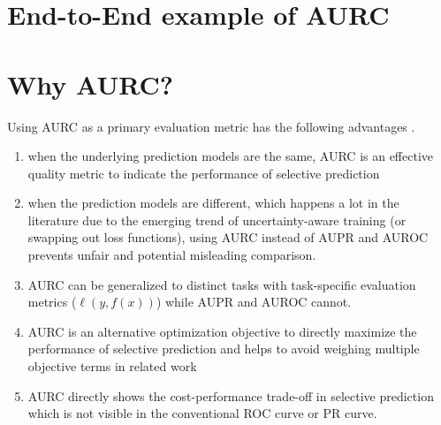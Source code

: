 


\section{End-to-End example of AURC}




\section*{Why AURC?}

Using AURC as a primary evaluation metric has the following advantages \cite{ding2020revisiting}.
\begin{enumerate}
    \item when the underlying prediction models are the same, AURC is an effective quality metric to indicate the performance of selective prediction
    \item  when the prediction models are different, which happens a lot in the literature due to the emerging trend of uncertainty-aware training (or swapping out loss functions), using AURC instead of AUPR and AUROC prevents unfair and potential misleading comparison.
    \item AURC can be generalized to distinct tasks with task-specific evaluation metrics ($\ell(y,f(x))$) while AUPR and AUROC cannot.
    \item AURC is an alternative optimization objective to directly maximize the performance of selective prediction and helps to avoid weighing multiple objective terms in related work
    \item AURC directly shows the cost-performance trade-off in selective prediction which is not visible in the conventional ROC curve or PR curve.
\end{enumerate}

\newpage
